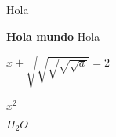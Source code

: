 \documentclass{book}
\begin{document}
\def\Hola{Hola}
\Hola

{\bf Hola mundo} Hola

$x+\sqrt{\sqrt{\sqrt{\sqrt{\sqrt{a}}}}} = 2$




$x^2$

$H_2O$

\end{document}
